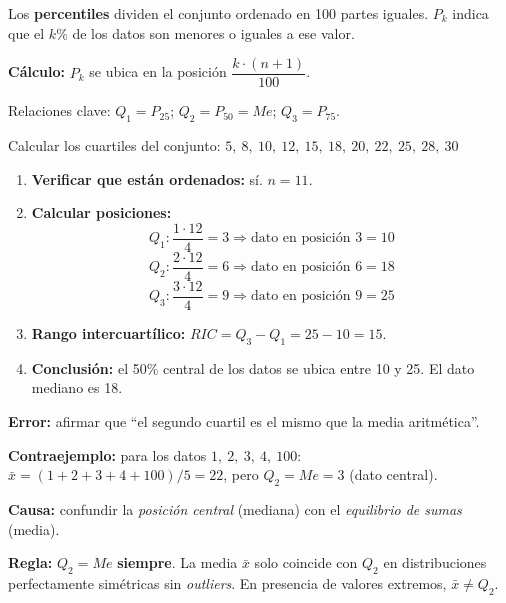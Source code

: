 \documentclass[11pt, letterpaper]{article}
\begin{document}
\begin{tcolorbox}[importantbox, title={Percentiles $P_k$}]
Los \textbf{percentiles} dividen el conjunto ordenado en 100 partes iguales. $P_k$ indica que el $k\%$ de los datos son menores o iguales a ese valor.

\textbf{C\'alculo:} $P_k$ se ubica en la posici\'on $\dfrac{k \cdot (n+1)}{100}$.

Relaciones clave: $Q_1 = P_{25}$;\; $Q_2 = P_{50} = Me$;\; $Q_3 = P_{75}$.
\end{tcolorbox}

\begin{tcolorbox}[examplebox, title={Ej. 9. C\'alculo de cuartiles}]
Calcular los cuartiles del conjunto: $5,\ 8,\ 10,\ 12,\ 15,\ 18,\ 20,\ 22,\ 25,\ 28,\ 30$

\begin{enumerate}[label=\textbf{Paso \arabic*.}]
  \item \textbf{Verificar que est\'an ordenados:} s\'i. $n = 11$.
  \medskip
  \item \textbf{Calcular posiciones:}
  \[
  Q_1: \frac{1 \cdot 12}{4} = 3 \Rightarrow \text{dato en posici\'on } 3 = 10
  \]
  \[
  Q_2: \frac{2 \cdot 12}{4} = 6 \Rightarrow \text{dato en posici\'on } 6 = 18
  \]
  \[
  Q_3: \frac{3 \cdot 12}{4} = 9 \Rightarrow \text{dato en posici\'on } 9 = 25
  \]
  \medskip
  \item \textbf{Rango intercuart\'ilico:} $RIC = Q_3 - Q_1 = 25 - 10 = 15$.
  \medskip
  \item \textbf{Conclusi\'on:} el 50\% central de los datos se ubica entre 10 y 25. El dato mediano es 18.
\end{enumerate}
\end{tcolorbox}

\begin{tcolorbox}[warningbox, title={Error frecuente: confundir $Q_2$ con la media}]
\textbf{Error:} afirmar que ``el segundo cuartil es el mismo que la media aritm\'etica''.

\medskip
\textbf{Contraejemplo:} para los datos $1,\ 2,\ 3,\ 4,\ 100$:
$\bar{x} = (1+2+3+4+100)/5 = 22$, pero $Q_2 = Me = 3$ (dato central).

\medskip
\textbf{Causa:} confundir la \textit{posici\'on central} (mediana) con el \textit{equilibrio de sumas} (media).

\medskip
\textbf{Regla:} $Q_2 = Me$ \textbf{siempre}. La media $\bar{x}$ solo coincide con $Q_2$ en distribuciones perfectamente sim\'etricas sin \textit{outliers}. En presencia de valores extremos, $\bar{x} \neq Q_2$.
\end{tcolorbox}
\end{document}
